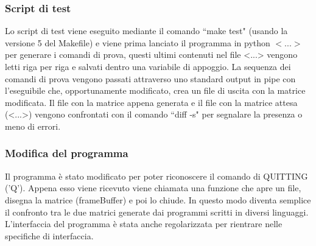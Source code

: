 \documentclass{article}
\begin{document}
	\subsubsection*{Script di test}
		Lo script di test viene eseguito mediante il comando ``make test" (usando la versione 5 del Makefile) e viene prima lanciato il programma in python $<$...$>$ per generare i comandi di prova, questi ultimi contenuti nel file <...> vengono letti riga per riga e salvati dentro una variabile di appoggio. La sequenza dei comandi di prova vengono passati attraverso uno standard output in pipe con l'eseguibile che, opportunamente modificato, crea un file di uscita con la matrice modificata. Il file con la matrice appena generata e il file con la matrice attesa (<...>) vengono confrontati con il comando ``diff -s" per segnalare la presenza o meno di errori.

	\subsubsection*{Modifica del programma}
		Il programma è stato modificato per poter riconoscere il comando di QUITTING ('Q'). Appena esso viene ricevuto
		viene chiamata una funzione che apre un file, disegna la matrice (frameBuffer) e poi lo chiude. In questo modo 
		diventa semplice il confronto tra le due matrici generate dai programmi scritti in diversi linguaggi.
		L'interfaccia del programma è stata anche regolarizzata per rientrare nelle specifiche di interfaccia.
\end{document}
